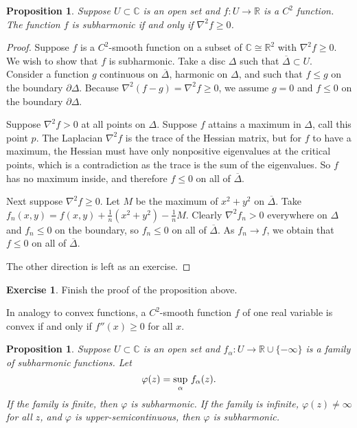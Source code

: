 \documentclass[12pt,openany]{book}
\newcommand{\avoidbreak}{\postdisplaypenalty=100}
\newcommand{\C}{{\mathbb{C}}}
\newcommand{\R}{{\mathbb{R}}}
\theoremstyle{plain}
\newtheorem{prop}[thm]{Proposition}
\theoremstyle{remark}
\theoremstyle{definition}
\newenvironment{exbox}{%
    \def\FrameCommand{\vrule width 1pt \relax\hspace{10pt}}%
    \MakeFramed{\advance\hsize-\width\FrameRestore}%
}{%
    \endMakeFramed
}
\theoremstyle{exercise}
\newtheorem{exercise}{Exercise}[section]
\theoremstyle{example}
\begin{document}
\begin{prop}
Suppose $U \subset \C$ is an open set and $f \colon U \to \R$ is a $C^2$ function.
The function $f$ is subharmonic if and only if
$\nabla^2 f \geq 0$.
\end{prop}

\begin{proof}
Suppose $f$ is a $C^2$-smooth function on a subset of $\C \cong \R^2$
with $\nabla^2 f \geq 0$.  We wish to show that $f$ is subharmonic.
Take a disc $\Delta$ such that $\overline{\Delta} \subset U$.
Consider a function
$g$ continuous on $\overline{\Delta}$,
harmonic on $\Delta$, and such that
$f \leq g$ on the boundary $\partial \Delta$.  Because
$\nabla^2 (f-g) = \nabla^2 f \geq 0$, we assume $g = 0$ and $f \leq 0$
on the boundary $\partial \Delta$. 

Suppose $\nabla^2 f > 0$ at all points on $\Delta$.
Suppose $f$ attains a maximum in $\Delta$,
call this point $p$.  
The Laplacian $\nabla^2 f$ is the trace of the Hessian matrix, but for $f$ to have a
maximum, the Hessian must have only nonpositive eigenvalues at the critical
points, which is a
contradiction as the trace is the sum of the eigenvalues.  So $f$ has no
maximum inside, and therefore $f \leq 0$ on all of
$\overline{\Delta}$.

Next suppose $\nabla^2 f \geq 0$.
Let $M$ be the maximum of $x^2+y^2$ on $\overline{\Delta}$.
Take $f_n(x,y) = f(x,y) + \frac{1}{n}
( x^2+y^2 ) - \frac{1}{n}M$.  Clearly $\nabla^2 f_n > 0$ everywhere on
$\Delta$ and
$f_n \leq 0$ on the boundary, so $f_n \leq 0$ 
on all of $\overline{\Delta}$.  As $f_n \to f$, we obtain that
$f \leq 0$ on all of $\overline{\Delta}$.

The other direction is left as an exercise.
\end{proof}

\begin{exbox}
\begin{exercise}
Finish the proof of the proposition above.
\end{exercise}
\end{exbox}

In analogy to convex functions, a $C^2$-smooth function $f$ of one
real variable is convex if and only if $f''(x) \geq 0$ for all $x$.

\begin{prop}
\pagebreak[2]%
Suppose $U \subset \C$ is an open set and $f_\alpha \colon U \to \R \cup \{ -\infty \}$
is a family of subharmonic functions.  Let
\begin{equation*}
\varphi(z) = \sup_\alpha\, f_\alpha(z) .
\avoidbreak
\end{equation*}
If the family is finite, then $\varphi$ is subharmonic.
If the family is infinite, $\varphi(z) \not= \infty$ for
all $z$, and $\varphi$
is upper-semicontinuous, then $\varphi$ is subharmonic.
\end{prop}
\end{document}
